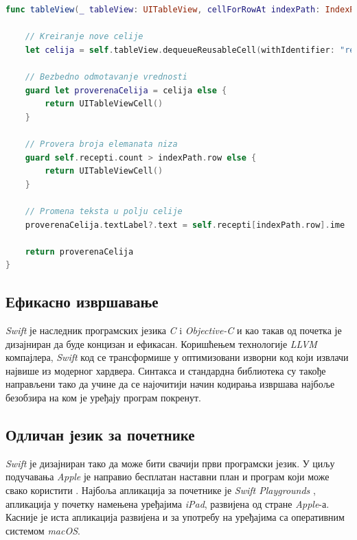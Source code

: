 \documentclass[12pt,oneside]{memoir}
\begin{document}
\begin{lstlisting}[caption=\textit{{Коришћење опционе променљиве}}, label={lst:Опциона променљива}, language=Swift, frame=single]
func tableView(_ tableView: UITableView, cellForRowAt indexPath: IndexPath) -> UITableViewCell {
        
    // Kreiranje nove celije
    let celija = self.tableView.dequeueReusableCell(withIdentifier: "receptCelija") as? UITableViewCell
    
    // Bezbedno odmotavanje vrednosti
    guard let proverenaCelija = celija else {
        return UITableViewCell()
    }
    
    // Provera broja elemanata niza
    guard self.recepti.count > indexPath.row else {
        return UITableViewCell()
    }
    
    // Promena teksta u polju celije
    proverenaCelija.textLabel?.text = self.recepti[indexPath.row].ime
    
    return proverenaCelija
}

\end{lstlisting}

\subsection{Ефикасно извршавање}

\indent \textit{Swift} је наследник програмских језика \textit{C} i \textit{Objective-C} и као такав од почетка је дизајниран да буде концизан и ефикасан. Коришћењем технологије \textit{LLVM} компајлера, \textit{Swift} код се трансформише у оптимизовани изворни код који извлачи највише из модерног хардвера. Синтакса и стандардна библиотека су такође направљени тако да учине да се најочитији начин кодирања извршава најбоље безобзира на ком је уређају програм покренут.

\subsection{Одличан језик за почетнике}

\textit{Swift} је дизајниран тако да може бити свачији први програмски језик. У циљу подучавања \textit{Apple} је направио бесплатан наставни план и програм који може свако користити \cite{Swift_Education}. Најбоља апликација за почетнике је \textit{Swift Playgrounds} \cite{Swift_Playground}, апликација у почетку намењена уређајима \textit{iPad}, развијена од стране \textit{Apple}-а. Касније је иста апликација развијена и за употребу на уређајима са оперативним системом \textit{macOS}. 
\end{document}
